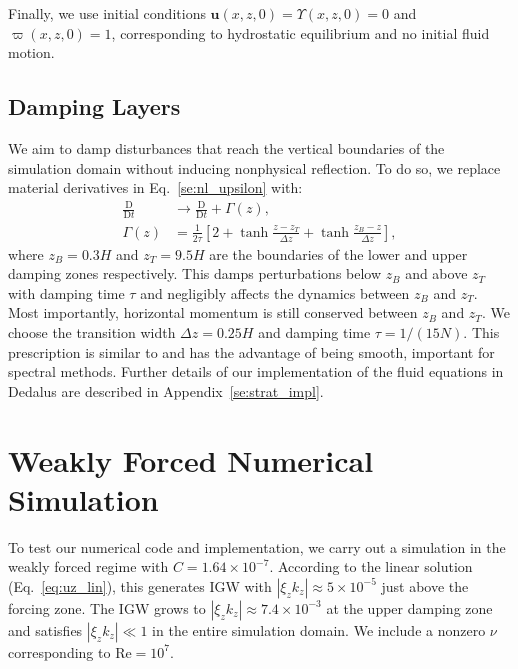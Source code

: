 \documentclass[
        fleqn,
        usenatbib,
    ]{mnras}
\newcommand*{\scinot}[2]{#1\times10^{#2}}
\newcommand*{\md}[2]{\frac{\mathrm{D}#1}{\mathrm{D}#2}}
\newcommand*{\abs}[1]{\left|#1\right|}
\newcommand*{\s}[1]{\left[#1\right]}
\newcommand*{\bm}[1]{\mathbf{#1}}
\begin{document}
Finally, we use initial conditions $\bm{u}(x, z, 0) = \Upsilon(x, z, 0) = 0$ and
$\varpi(x, z, 0) = 1$, corresponding to hydrostatic equilibrium and no initial
fluid motion.

\subsection{Damping Layers}\label{ss:damping}

We aim to damp disturbances that reach the vertical boundaries of the simulation
domain without inducing nonphysical reflection. To do so, we replace material
derivatives in Eq.~\eqref{se:nl_upsilon} with:
\begin{align}
    \md{}{t} &\to \md{}{t} + \Gamma(z),\\
    \Gamma(z) &= \frac{1}{2\tau}\s{2 + \tanh \frac{z - z_T}{\Delta z}
        + \tanh \frac{z_B - z}{\Delta z}},\label{eq:Gamma}
\end{align}
where $z_B = 0.3H$ and $z_T = 9.5H$ are the boundaries of the lower and upper
damping zones respectively. This damps perturbations below $z_B$ and
above $z_T$ with damping time $\tau$ and negligibly affects the dynamics between
$z_B$ and $z_T$. \textcolor{Corr}{Most importantly, horizontal momentum is still
conserved between $z_B$ and $z_T$}. We choose the transition width $\Delta z =
0.25H$ and damping time $\tau = 1 / (15N)$. This prescription is similar to
\citet{lecoanet_damp} and has the advantage of being smooth, important for
spectral methods. Further details of our implementation of the fluid equations
in Dedalus are described in Appendix~\ref{se:strat_impl}.

\section{Weakly Forced Numerical Simulation}\label{s:weak_sim}

To test our numerical code and implementation, we carry out a simulation in the
weakly forced regime with $C = \scinot{1.64}{-7}$. According to the linear
solution (Eq.~\eqref{eq:uz_lin}), this generates IGW with $\abs{\xi_z k_z}
\approx \scinot{5}{-5}$ just above the forcing zone. The IGW grows to $\abs{\xi_z
k_z} \approx \scinot{7.4}{-3}$ at the upper damping zone and satisfies
$\abs{\xi_z k_z} \ll 1$ in the entire simulation domain. We include a nonzero
$\nu$ corresponding to $\mathrm{Re} = 10^7$.
\end{document}
